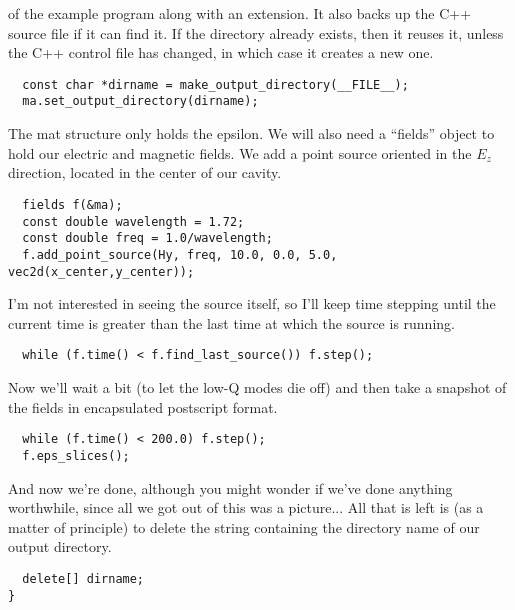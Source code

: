 of the example program along with an extension.  It also backs up the C++
source file if it can find it.  If the directory already exists, then it
reuses it, unless the C++ control file has changed, in which case it
creates a new one.
\begin{verbatim}
  const char *dirname = make_output_directory(__FILE__);
  ma.set_output_directory(dirname);
\end{verbatim}
The mat structure only holds the epsilon.  We will also need a ``fields''
object to hold our electric and magnetic fields.  We add a point source
oriented in the $E_z$ direction, located in the center of our cavity.
\begin{verbatim}
  fields f(&ma);
  const double wavelength = 1.72;
  const double freq = 1.0/wavelength;
  f.add_point_source(Hy, freq, 10.0, 0.0, 5.0, vec2d(x_center,y_center));
\end{verbatim}
I'm not interested in seeing the source itself, so I'll keep time stepping
until the current time is greater than the last time at which the source is
running.
\begin{verbatim}
  while (f.time() < f.find_last_source()) f.step();
\end{verbatim}
Now we'll wait a bit (to let the low-Q modes die off) and then take a
snapshot of the fields in encapsulated postscript format.
\begin{verbatim}
  while (f.time() < 200.0) f.step();
  f.eps_slices();
\end{verbatim}
And now we're done, although you might wonder if we've done anything
worthwhile, since all we got out of this was a picture... All that is left
is (as a matter of principle) to delete the string containing the directory
name of our output directory.
\begin{verbatim}
  delete[] dirname;
}
\end{verbatim}